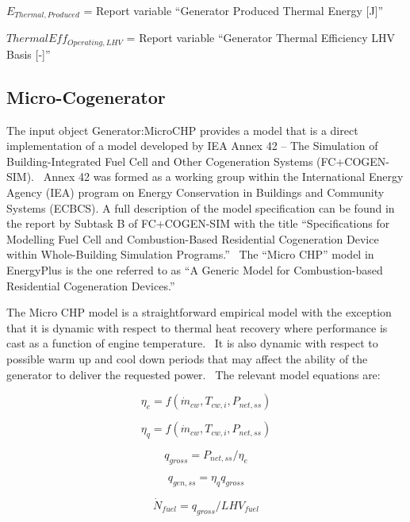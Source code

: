 \({E_{Thermal,Produced}}\) = Report variable ``Generator Produced Thermal Energy {[}J{]}''

\(ThermalEf{f_{Operating,LHV}}\) = Report variable ``Generator Thermal Efficiency LHV Basis {[}-{]}''

\subsection{Micro-Cogenerator}\label{micro-cogenerator}

The input object Generator:MicroCHP provides a model that is a direct implementation of a model developed by IEA Annex 42 -- The Simulation of Building-Integrated Fuel Cell and Other Cogeneration Systems (FC+COGEN-SIM).~ Annex 42 was formed as a working group within the International Energy Agency (IEA) program on Energy Conservation in Buildings and Community Systems (ECBCS). A full description of the model specification can be found in the report by Subtask B of FC+COGEN-SIM with the title ``Specifications for Modelling Fuel Cell and Combustion-Based Residential Cogeneration Device within Whole-Building Simulation Programs.''~ The ``Micro CHP'' model in EnergyPlus is the one referred to as ``A Generic Model for Combustion-based Residential Cogeneration Devices.''

The Micro CHP model is a straightforward empirical model with the exception that it is dynamic with respect to thermal heat recovery where performance is cast as a function of engine temperature.~ It is also dynamic with respect to possible warm up and cool down periods that may affect the ability of the generator to deliver the requested power.~ The relevant model equations are:

\begin{equation}
{\eta_e} = f({\dot m_{cw}},{T_{cw,i}},{P_{net,ss}})
\end{equation}

\begin{equation}
{\eta_q} = f({\dot m_{cw}},{T_{cw,i}},{P_{net,ss}})
\end{equation}

\begin{equation}
{q_{gross}} = {P_{net,ss}}/{\eta_e}
\end{equation}

\begin{equation}
{q_{gen,ss}} = {\eta_q}{q_{gross}}
\end{equation}

\begin{equation}
{\dot N_{fuel}} = {q_{gross}}/LH{V_{fuel}}
\end{equation}

